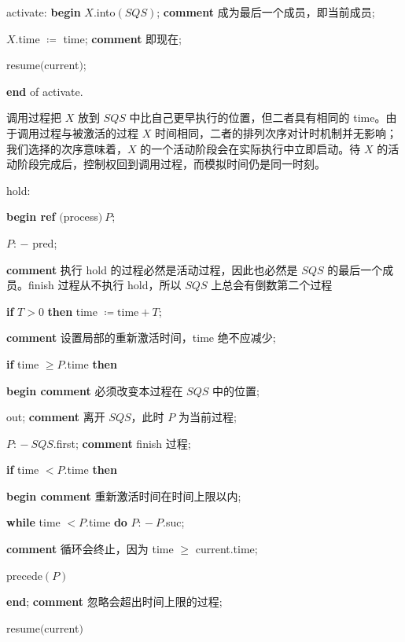 \documentclass[twoside,11pt,fontset=none]{ctexbook}
\begin{document}
\quad activate: \textbf{begin} $X$.into$(SQS)$; \textbf{comment} 成为最后一个成员，即当前成员;

\quad \quad $X$.time $\coloneq$ time; \textbf{comment} 即现在;

\quad \quad resume$($current$)$;

\quad \textbf{end} of activate.

\noindent
调用过程把 $X$ 放到 $SQS$ 中比自己更早执行的位置，但二者具有相同的 time。由于调用过程与被激活的过程 $X$ 时间相同，二者的排列次序对计时机制并无影响；我们选择的次序意味着，$X$ 的一个活动阶段会在实际执行中立即启动。待 $X$ 的活动阶段完成后，控制权回到调用过程，而模拟时间仍是同一时刻。

\quad hold:

\quad \textbf{begin ref} $($process$)\ P$;

\quad \quad $P$: $-$ pred;

\parindent\quad \quad \textbf{comment} 执行 hold 的过程必然是活动过程，因此也必然是 $SQS$ 的最后一个成员。finish 过程从不执行 hold，所以 $SQS$ 上总会有倒数第二个过程

\quad \quad \textbf{if} $T > 0$ \textbf{then} time $\coloneq \text{time} + T$;

\quad \quad \textbf{comment} 设置局部的重新激活时间，time 绝不应减少;

\quad \quad \textbf{if} time $\geqslant P$.time \textbf{then}

\quad \quad \quad \textbf{begin comment} 必须改变本过程在 $SQS$ 中的位置;

\quad \quad \quad \quad out; \textbf{comment} 离开 $SQS$，此时 $P$ 为当前过程;

\quad \quad \quad \quad $P$: $-\ SQS$.first; \textbf{comment} finish 过程;

\quad \quad \quad \quad \textbf{if} time $< P$.time \textbf{then}

\quad \quad \quad \quad \quad \textbf{begin comment} 重新激活时间在时间上限以内;

\quad \quad \quad \quad \quad \quad \textbf{while} time $< P$.time \textbf{do} $P$: $-\ P$.suc;

\quad \quad \quad \quad \quad \quad \textbf{comment} 循环会终止，因为 time $\geqslant$ current.time;

\quad \quad \quad \quad \quad \quad precede$(P)$

\quad \quad \quad \quad \quad \textbf{end}; \textbf{comment} 忽略会超出时间上限的过程;

\quad \quad \quad \quad resume$($current$)$
\end{document}
